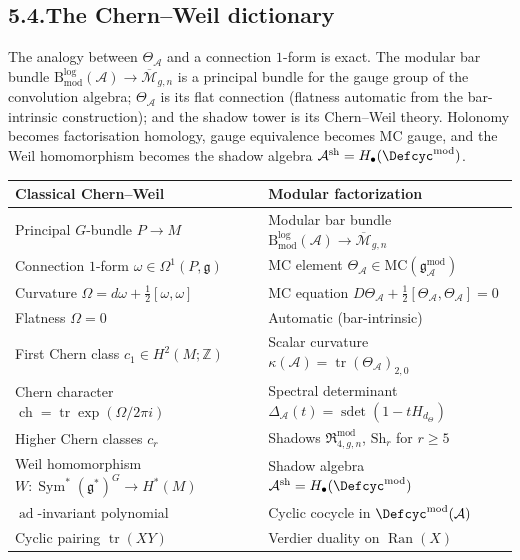 \documentclass[11pt]{report}
\theoremstyle{definition}
\theoremstyle{remark}
\providecommand{\cA}{\mathcal{A}}
\providecommand{\cM}{\mathcal{M}}
\providecommand{\fg}{\mathfrak{g}}
\providecommand{\gAmod}{\mathfrak{g}^{\mathrm{mod}}_\cA}
\numberwithin{equation}{section}
\begin{document}
\subsection*{5.4.\enspace The Chern--Weil dictionary}

The analogy between $\Theta_\cA$ and a connection $1$-form is
exact. The modular bar bundle
$\mathrm{B}^{\log}_{\mathrm{mod}}(\cA)\to\overline{\cM}_{g,n}$
is a principal bundle for the gauge group of the convolution
algebra; $\Theta_\cA$ is its flat connection (flatness automatic
from the bar-intrinsic construction); and the shadow
tower is its Chern--Weil theory. Holonomy becomes factorisation
homology, gauge equivalence becomes MC gauge, and the Weil
homomorphism becomes the shadow algebra
$\cA^{\mathrm{sh}} = H_\bullet(\Defcyc^{\mathrm{mod}})$.

\begin{center}
\renewcommand{\arraystretch}{1.25}
\begin{tabular}{ll}
\textbf{Classical Chern--Weil}
 & \textbf{Modular factorization}\\
\hline
Principal $G$-bundle $P\to M$
 & Modular bar bundle
 $\mathrm{B}^{\log}_{\mathrm{mod}}(\cA)\to\overline{\cM}_{g,n}$\\[2pt]
Connection $1$-form $\omega\in\Omega^1(P,\fg)$
 & MC element $\Theta_\cA\in\mathrm{MC}(\gAmod)$\\[2pt]
Curvature $\Omega=d\omega+\frac{1}{2}[\omega,\omega]$
 & MC equation $D\Theta_\cA+\tfrac12[\Theta_\cA,\Theta_\cA]=0$\\[2pt]
Flatness $\Omega=0$
 & Automatic (bar-intrinsic)\\[2pt]
First Chern class $c_1\in H^2(M;\mathbb Z)$
 & Scalar curvature $\kappa(\cA)=\operatorname{tr}(\Theta_\cA)_{2,0}$\\[2pt]
Chern character $\operatorname{ch}=\operatorname{tr}\exp(\Omega/2\pi i)$
 & Spectral determinant
 $\Delta_\cA(t)=\operatorname{sdet}(1-tH_{d_\Theta})$\\[2pt]
Higher Chern classes $c_r$
 & Shadows $\mathfrak R^{\mathrm{mod}}_{4,g,n}$,
 $\mathrm{Sh}_r$ for $r\ge 5$\\[2pt]
Weil homomorphism $W\colon\operatorname{Sym}^*(\fg^*)^G\to H^*(M)$
 & Shadow algebra
 $\cA^{\mathrm{sh}}=H_\bullet(\Defcyc^{\mathrm{mod}})$\\[2pt]
$\operatorname{ad}$-invariant polynomial
 & Cyclic cocycle in $\Defcyc^{\mathrm{mod}}(\cA)$\\[2pt]
Cyclic pairing $\operatorname{tr}(XY)$
 & Verdier duality on $\operatorname{Ran}(X)$\\[2pt]

\end{tabular}
\end{center}
\end{document}
